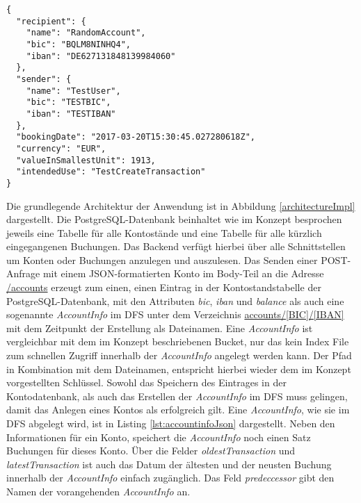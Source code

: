 \documentclass[12pt,oneside,a4paper,parskip]{scrbook}
\begin{document}
\begin{lstlisting}[label=lst:transactionJson,
           language={},
           firstnumber=1,
           caption=Buchung in JSON-Format.]           
{
  "recipient": {
    "name": "RandomAccount",
    "bic": "BQLM8NINHQ4",
    "iban": "DE627131848139984060"
  },
  "sender": {
    "name": "TestUser",
    "bic": "TESTBIC",
    "iban": "TESTIBAN"
  },
  "bookingDate": "2017-03-20T15:30:45.027280618Z",
  "currency": "EUR",
  "valueInSmallestUnit": 1913,
  "intendedUse": "TestCreateTransaction"
}
\end{lstlisting}

Die grundlegende Architektur der Anwendung ist in Abbildung \ref{architectureImpl} dargestellt. Die PostgreSQL-Datenbank beinhaltet wie im Konzept besprochen jeweils eine Tabelle für alle Kontostände und eine Tabelle für alle kürzlich eingegangenen Buchungen. Das Backend verfügt hierbei über alle Schnittstellen um Konten oder Buchungen anzulegen und auszulesen.  Das Senden einer POST-Anfrage mit einem JSON-formatierten Konto im Body-Teil an die Adresse \url{/accounts} erzeugt zum einen, einen Eintrag in der Kontostandstabelle der PostgreSQL-Datenbank, mit den Attributen \textit{bic}, \textit{iban} und \textit{balance} als auch  eine sogenannte \textit{AccountInfo} im DFS unter dem Verzeichnis \url{accounts/[BIC]/[IBAN]} mit dem Zeitpunkt der Erstellung als Dateinamen. Eine \textit{AccountInfo} ist vergleichbar mit dem im Konzept beschriebenen Bucket, nur das kein Index File zum schnellen Zugriff innerhalb der \textit{AccountInfo} angelegt werden kann. Der Pfad in Kombination mit dem Dateinamen, entspricht hierbei wieder dem im Konzept vorgestellten Schlüssel. Sowohl das Speichern des Eintrages in der Kontodatenbank, als auch das Erstellen der \textit{AccountInfo} im DFS muss gelingen, damit das Anlegen eines Kontos als erfolgreich gilt. Eine \textit{AccountInfo}, wie sie im DFS abgelegt wird, ist in Listing \ref{lst:accountinfoJson} dargestellt. Neben den Informationen für ein Konto, speichert die \textit{AccountInfo} noch einen Satz Buchungen für dieses Konto. Über die Felder \textit{oldestTransaction} und \textit{latestTransaction} ist auch das Datum der ältesten und der neusten Buchung innerhalb der \textit{AccountInfo} einfach zugänglich. Das Feld \textit{predeccessor} gibt den Namen der vorangehenden \textit{AccountInfo} an.
\end{document}
